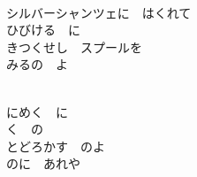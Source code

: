 \documentclass[10pt,b5j]{tarticle} %
\begin{document}
\begin{enumerate}
\begin{minipage}[c]{\blocksize}
        \vspace{\linespace}
        \item~\\
        シルバーシャンツェに　はくれて\\
        ひびける　に\\
        きつくせし　スプールを\\
        みるの　よ
        
    \end{minipage}
    \begin{minipage}[c]{\blocksize}
        
        \vspace{\linespace}
        \item~\\
        にめく　に\\
        く　の\\
        とどろかす　のよ\\
        のに　あれや
    
    \end{minipage}
\end{enumerate} %
\end{document}
